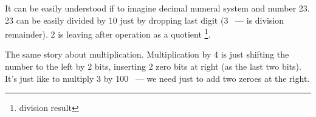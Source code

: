 {It can be easily understood if to imagine decimal numeral system and number 23.
23 can be easily divided by 10 just by dropping last digit (3 ~--- is division remainder). 
2 is leaving after operation as a quotient
\footnote{division result}.}

{The same story about multiplication. Multiplication by 4 is just shifting the number to the left by 2 bits,
inserting 2 zero bits at right (as the last two bits).
It's just like to multiply 3 by 100 ~--- we need just to add two zeroes at the right.}
